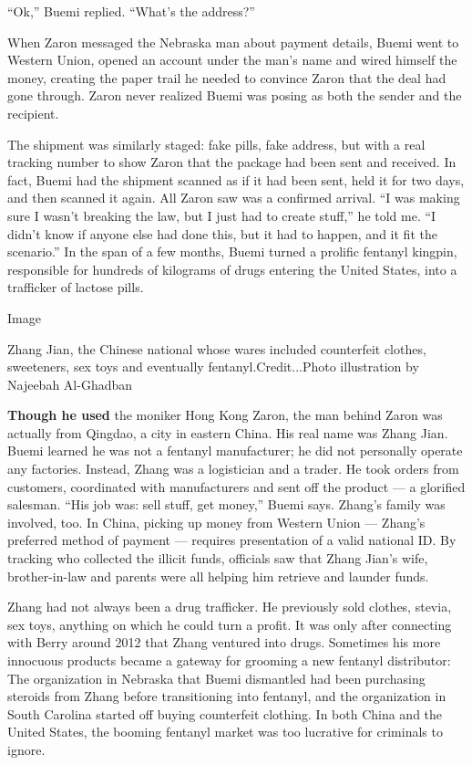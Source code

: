 ``Ok,'' Buemi replied. ``What's the address?''

When Zaron messaged the Nebraska man about payment details, Buemi went
to Western Union, opened an account under the man's name and wired
himself the money, creating the paper trail he needed to convince Zaron
that the deal had gone through. Zaron never realized Buemi was posing as
both the sender and the recipient.

The shipment was similarly staged: fake pills, fake address, but with a
real tracking number to show Zaron that the package had been sent and
received. In fact, Buemi had the shipment scanned as if it had been
sent, held it for two days, and then scanned it again. All Zaron saw was
a confirmed arrival. ``I was making sure I wasn't breaking the law, but
I just had to create stuff,'' he told me. ``I didn't know if anyone else
had done this, but it had to happen, and it fit the scenario.'' In the
span of a few months, Buemi turned a prolific fentanyl kingpin,
responsible for hundreds of kilograms of drugs entering the United
States, into a trafficker of lactose pills.

Image

Zhang Jian, the Chinese national whose wares included counterfeit
clothes, sweeteners, sex toys and eventually fentanyl.Credit...Photo
illustration by Najeebah Al-Ghadban

\textbf{Though he used} the moniker Hong Kong Zaron, the man behind
Zaron was actually from Qingdao, a city in eastern China. His real name
was Zhang Jian. Buemi learned he was not a fentanyl manufacturer; he did
not personally operate any factories. Instead, Zhang was a logistician
and a trader. He took orders from customers, coordinated with
manufacturers and sent off the product --- a glorified salesman. ``His
job was: sell stuff, get money,'' Buemi says. Zhang's family was
involved, too. In China, picking up money from Western Union --- Zhang's
preferred method of payment --- requires presentation of a valid
national ID. By tracking who collected the illicit funds, officials saw
that Zhang Jian's wife, brother-in-law and parents were all helping him
retrieve and launder funds.

Zhang had not always been a drug trafficker. He previously sold clothes,
stevia, sex toys, anything on which he could turn a profit. It was only
after connecting with Berry around 2012 that Zhang ventured into drugs.
Sometimes his more innocuous products became a gateway for grooming a
new fentanyl distributor: The organization in Nebraska that Buemi
dismantled had been purchasing steroids from Zhang before transitioning
into fentanyl, and the organization in South Carolina started off buying
counterfeit clothing. In both China and the United States, the booming
fentanyl market was too lucrative for criminals to ignore.


